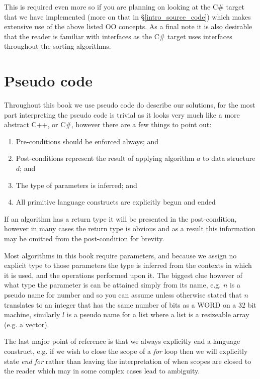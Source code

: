 This is required even more so if you are planning on looking at the C\# target that we have implemented (more on that in \S\ref{intro_source_code}) which makes extensive use of the above listed OO concepts. As a final note it is also desirable that the reader is familiar with interfaces as the C\# target uses interfaces throughout the sorting algorithms.

\section{Pseudo code}
Throughout this book we use pseudo code do describe our solutions, for the most part interpreting the pseudo code is trivial as it looks very much like a more abstract C++, or C\#, however there are a few things to point out:

\begin{enumerate}
\item Pre-conditions should be enforced always; and
\item Post-conditions represent the result of applying algorithm $a$ to data structure $d$; and
\item The type of parameters is inferred; and
\item All primitive language constructs are explicitly begun and ended
\end{enumerate}

If an algorithm has a return type it will be presented in the post-condition, however in many cases the return type is obvious and as a result this information may be omitted from the post-condition for brevity.

Most algorithms in this book require parameters, and because we assign no explicit type to those parameters the type is inferred from the contexts in which it is used, and the operations performed upon it. The biggest clue however of what type the parameter is can be attained simply from its name, e.g. $n$ is a pseudo name for number and so you can assume unless otherwise stated that $n$ translates to an integer that has the same number of bits as a WORD on a $32$ bit machine, similarly $l$ is a pseudo name for a list where a list is a resizeable array (e.g. a vector).

The last major point of reference is that we always explicitly end a language construct, e.g. if we wish to close the scope of a \textit{for} loop then we will explicitly state \textit{end for} rather than leaving the interpretation of when scopes are closed to the reader which may in some complex cases lead to ambiguity.

